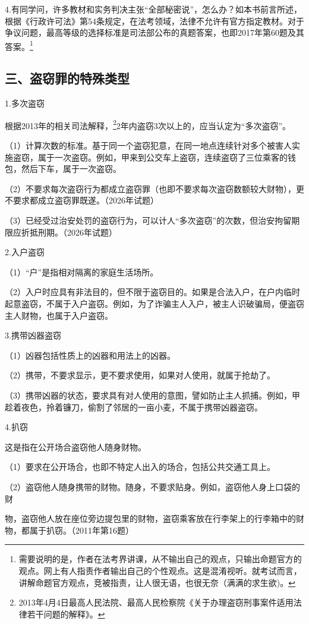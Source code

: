 4.有同学问，许多教材和实务判决主张“全部秘密说”，怎么办？如本书前言所述，根据《行政许可法》第54条规定，在法考领域，法律不允许有官方指定教材。对于争议问题，最高等级的选择标准是司法部公布的真题答案，也即2017年第60题及其答案。\footnote{需要说明的是，作者在法考界讲课，从不输出自己的观点，只输出命题官方的观点。网上有人指责作者输出自己的个性观点。这是混淆视听。就考试而言，讲解命题官方观点，竞被指责，让人很无语，也很无奈（满满的求生欲)。}

\subsection*{三、盗窃罪的特殊类型}

1.多次盗窃

根据2013年的相关司法解释，\footnote{2013年4月4日最高人民法院、最高人民检察院《关于办理盗窃刑事案件适用法律若干问题的解释》。}2年内盗窃3次以上的，应当认定为“多次盗窃”。

（1）计算次数的标准。基于同一个盗窃犯意，在同一地点连续针对多个被害人实施盗窃，属于一次盗窃。例如，甲来到公交车上盗窃，连续盗窃了三位乘客的钱包，然后下车，属于一次盗窃。

（2）不要求每次盗窃行为都成立盗窃罪（也即不要求每次盗窃数额较大财物），更不要求都成立盗窃罪既遂。（2026年试题）

（3）已经受过治安处罚的盗窃行为，可以计人“多次盗窃”的次数，但治安拘留期限应折抵刑期。（2026年试题）

2.入户盗窃

（1）“户”是指相对隔离的家庭生活场所。

（2）入户时应具有非法目的，但不限于盗窃目的。如果是合法入户，在户内临时起意盗窃，不属于入户盗窃。例如，为了诈骗主人入户，被主人识破骗局，便盗窃主人财物，也属于入户盗窃。

3.携带凶器盗窃

（1）凶器包括性质上的凶器和用法上的凶器。

（2）携带，不要求显示，更不要求使用，如果对人使用，就属于抢劫了。

（3）携带凶器的状态，要求具有对人使用的意图，譬如防止主人抓捕。例如，甲趁着夜色，拎着镰刀，偷割了邻居的一亩小麦，不属于携带凶器盗窃。

4.扒窃

这是指在公开场合盗窃他人随身财物。

（1）要求在公开场合，也即不特定人出入的场合，包括公共交通工具上。

（2）盗窃他人随身携带的财物。随身，不要求贴身。例如，盗窃他人身上口袋的财

物，盗窃他人放在座位旁边提包里的财物，盗窃乘客放在行李架上的行李箱中的财物，都属于扒窃。（2011年第16题）

